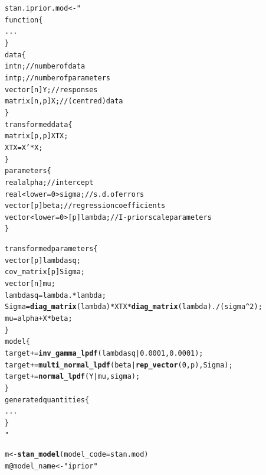 \documentclass{beamer}\usepackage[]{graphicx}\usepackage[]{color}
\makeatletter
\newcommand{\hlstr}[1]{\textcolor[rgb]{0.192,0.494,0.8}{#1}}%
\newcommand{\hlopt}[1]{\textcolor[rgb]{0,0,0}{#1}}%
\newcommand{\hlstd}[1]{\textcolor[rgb]{0.345,0.345,0.345}{#1}}%
\newcommand{\hlkwb}[1]{\textcolor[rgb]{0.69,0.353,0.396}{#1}}%
\newcommand{\hlkwc}[1]{\textcolor[rgb]{0.333,0.667,0.333}{#1}}%
\newcommand{\hlkwd}[1]{\textcolor[rgb]{0.737,0.353,0.396}{\textbf{#1}}}%
\newenvironment{kframe}{%
 \def\at@end@of@kframe{}%
 \ifinner\ifhmode%
  \def\at@end@of@kframe{\end{minipage}}%
  \begin{minipage}{\columnwidth}%
 \fi\fi%
 \def\FrameCommand##1{\hskip\@totalleftmargin \hskip-\fboxsep
 \colorbox{shadecolor}{##1}\hskip-\fboxsep
     \hskip-\linewidth \hskip-\@totalleftmargin \hskip\columnwidth}%
 \MakeFramed {\advance\hsize-\width
   \@totalleftmargin\z@ \linewidth\hsize
   \@setminipage}}%
 {\par\unskip\endMakeFramed%
 \at@end@of@kframe}
\newenvironment{knitrout}{}{} %
\makeatother
\begin{document}
\newsavebox{\stana}
\begin{lrbox}{\stana}
\begin{knitrout}\footnotesize
{}\color{fgcolor}\begin{kframe}
\begin{alltt}
stan.iprior.mod <- "
  function \{
    ...
  \}
  data \{
    int n; // number of data
    int p; // number of parameters
    vector[n] Y; // responses
    matrix[n, p] X; // (centred) data
  \}
  transformed data \{
    matrix[p, p] XTX;
    XTX = X' * X;
  \}
  parameters \{
    real alpha;  // intercept
    real<lower=0> sigma;  // s.d. of errors
    vector[p] beta;  // regression coefficients
    vector<lower=0>[p] lambda;  // I-prior scale parameters
  \}
\end{alltt}
\end{kframe}
\end{knitrout}
\end{lrbox}

\newsavebox{\stanb}
\begin{lrbox}{\stanb}
\begin{knitrout}\footnotesize
{}\color{fgcolor}\begin{kframe}
\begin{alltt}
transformed parameters \{
  vector[p] lambdasq;
  cov_matrix[p] Sigma;
  vector[n] mu;
  lambdasq = lambda .* lambda;
  Sigma = \hlkwd{diag_matrix}(lambda) * XTX * \hlkwd{diag_matrix}(lambda) ./ (sigma ^ 2);
  mu = alpha + X * beta;
\}
model \{
  target += \hlkwd{inv_gamma_lpdf}(lambdasq | 0.0001, 0.0001);
  target += \hlkwd{multi_normal_lpdf}(beta | \hlkwd{rep_vector}(0, p), Sigma);
  target += \hlkwd{normal_lpdf}(Y | mu, sigma);
\}
generated quantities \{
  ...
\}
"
\end{alltt}
\end{kframe}
\end{knitrout}
\end{lrbox}



\newsavebox{\stancomp}
\begin{lrbox}{\stancomp}
\begin{knitrout}\small
{}\color{fgcolor}\begin{kframe}
\begin{alltt}
\hlstd{m} \hlkwb{<-} \hlkwd{stan_model}\hlstd{(}\hlkwc{model_code} \hlstd{= stan.mod)}
\hlstd{m}\hlopt{@}\hlkwc{model_name} \hlkwb{<-} \hlstr{"iprior"}
\end{alltt}
\end{kframe}
\end{knitrout}
\end{lrbox}
\end{document}
